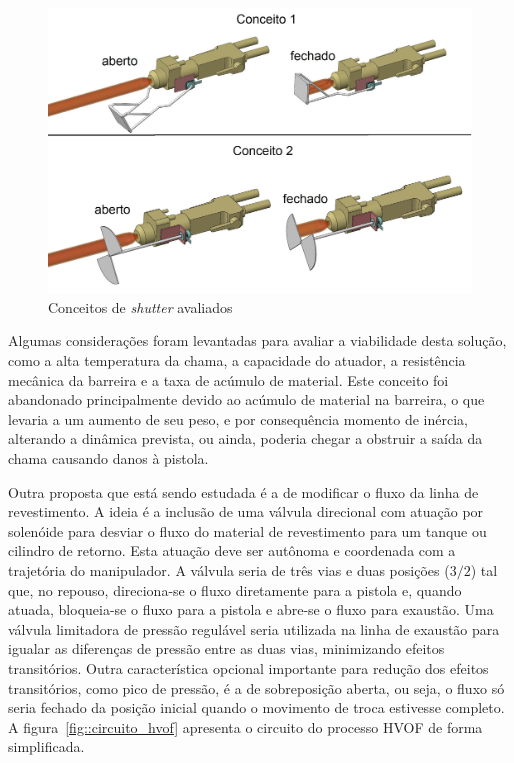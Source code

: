 \begin{figure}[h!]
   \centering
   \includegraphics[width=0.8\columnwidth]{detail/figs/shutter/shutter_todos}
   \caption{Conceitos de \textit{shutter} avaliados}
   \label{fig::shutter_todos}
\end{figure}

Algumas considerações foram levantadas para avaliar a viabilidade
desta solução, como a alta temperatura da chama, a capacidade do atuador, a
resistência mecânica da barreira e a taxa de acúmulo de material. Este conceito
foi abandonado principalmente devido ao acúmulo de material na barreira, o que
levaria a um aumento de seu peso, e por consequência momento de inércia,
alterando a dinâmica prevista, ou ainda, poderia chegar a obstruir a saída da
chama causando danos à pistola.

Outra proposta que está sendo estudada é a de modificar o fluxo da linha de
revestimento. A ideia é a inclusão de uma válvula direcional com atuação por
solenóide para desviar o fluxo do material de revestimento para um tanque ou
cilindro de retorno. Esta atuação deve ser autônoma e coordenada com a
trajetória do manipulador. A válvula seria de três vias e duas posições ($3/2$) tal que, no 
repouso, direciona-se o fluxo diretamente para a pistola e, quando
atuada, bloqueia-se o fluxo para a pistola e abre-se o fluxo para exaustão. Uma
válvula limitadora de pressão regulável seria utilizada na linha de exaustão
para igualar as diferenças de pressão entre as duas vias, minimizando efeitos
transitórios.
Outra característica opcional importante para redução dos efeitos transitórios,
como pico de pressão, é a de sobreposição aberta, ou seja, o fluxo só seria
fechado da posição inicial quando o movimento de troca estivesse completo. 
A figura~\ref{fig::circuito_hvof} apresenta o circuito do processo HVOF de forma
simplificada.

